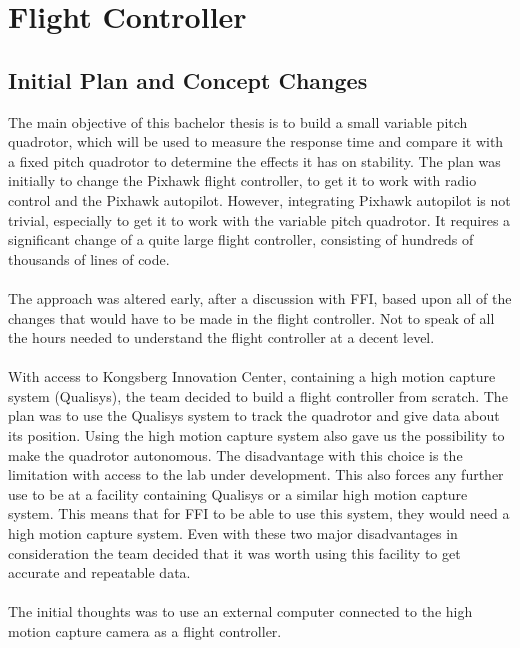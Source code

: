 \section{Flight Controller}

\subsection{Initial Plan and Concept Changes}
The main objective of this bachelor thesis is to build a small variable pitch quadrotor, which will be used to measure the response time and compare it with a fixed pitch quadrotor to determine the effects it has on stability. The plan was initially to change the Pixhawk flight controller, to get it to work with radio control and the Pixhawk autopilot. However, integrating Pixhawk autopilot is not trivial, especially to get it to work with the variable pitch quadrotor. It requires a significant change of a quite large flight controller, consisting of hundreds of thousands of lines of code. 
\\\\
The approach was altered early, after a discussion with FFI, based upon all of the changes that would have to be made in the flight controller. Not to speak of all the hours needed to understand the flight controller at a decent level. 
\\\\
With access to Kongsberg Innovation Center, containing a high motion capture system (Qualisys), the team decided to build a flight controller from scratch. The plan was to use the Qualisys system to track the quadrotor and give data about its position. Using the high motion capture system also gave us the possibility to make the quadrotor autonomous. The disadvantage with this choice is the limitation with access to the lab under development. This also forces any further use to be at a facility containing Qualisys or a similar high motion capture system. This means that for FFI to be able to use this system, they would need a high motion capture system. Even with these two major disadvantages in consideration the team decided that it was worth using this facility to get accurate and repeatable data.  
\\\\
The initial thoughts was to use an external computer connected to the high motion capture camera as a flight controller.\\
